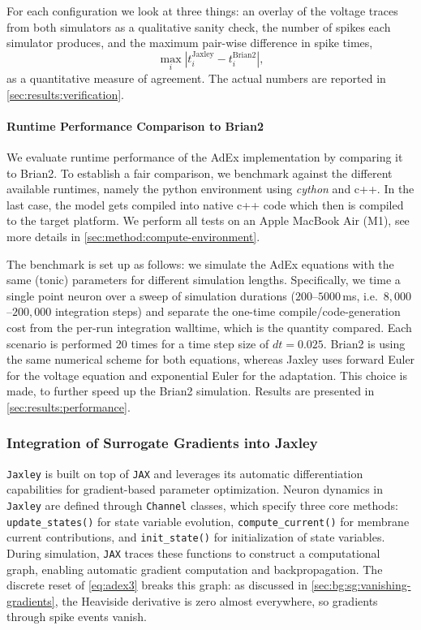 For each configuration we look at three things: an overlay of the voltage traces from both simulators as a qualitative sanity check, the number of spikes each simulator produces, and the maximum pair-wise difference in spike times,
$$\max_i |t_i^{\text{Jaxley}} - t_i^{\text{Brian2}}|,$$
as a quantitative measure of agreement.
The actual numbers are reported in \cref{sec:results:verification}.

\paragraph{Runtime Performance Comparison to Brian2}\label{sec:method:adex:runtime}
We evaluate runtime performance of the AdEx implementation by comparing it to Brian2.
To establish a fair comparison, we benchmark against the different available runtimes, namely the python environment using \textit{cython} and c++.
In the last case, the model gets compiled into native c++ code which then is compiled to the target platform.
We perform all tests on an Apple MacBook Air (M1), see more details in \cref{sec:method:compute-environment}.

The benchmark is set up as follows:
we simulate the AdEx equations with the same (tonic) parameters for different simulation lengths.
Specifically, we time a single point neuron over a sweep of simulation durations ($200$--$5000$\,ms, i.e.\ $8{,}000$--$200{,}000$ integration steps)
and separate the one-time compile/code-generation cost from the per-run integration walltime, which is the quantity compared.
Each scenario is performed 20 times for a time step size of $dt = 0.025$.
Brian2 is using the same numerical scheme for both equations, whereas Jaxley uses forward Euler for the voltage equation and
exponential Euler for the adaptation.
This choice is made, to further speed up the Brian2 simulation.
Results are presented in \cref{sec:results:performance}.


\subsubsection{Integration of Surrogate Gradients into Jaxley}\label{sec:method:surrogate-gradients}
\texttt{Jaxley} is built on top of \texttt{JAX} and leverages its automatic differentiation capabilities for gradient-based parameter optimization.
Neuron dynamics in \texttt{Jaxley} are defined through \texttt{Channel} classes, which specify three core methods:
\texttt{update\_states()} for state variable evolution, \texttt{compute\_current()} for membrane current contributions, and \texttt{init\_state()} for initialization of state variables.
During simulation, \texttt{JAX} traces these functions to construct a computational graph, enabling automatic gradient computation and backpropagation.
The discrete reset of \cref{eq:adex3} breaks this graph: as discussed in \cref{sec:bg:sg:vanishing-gradients}, the Heaviside derivative is zero almost everywhere, so gradients through spike events vanish.

